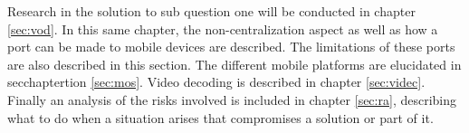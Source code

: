 Research in the solution to sub question one will be conducted in chapter \ref{sec:vod}. In this same chapter, the non-centralization aspect as well as how a port can be made to mobile devices are described. The limitations of these ports are also described in this section. The different mobile platforms are elucidated in secchaptertion \ref{sec:mos}. Video decoding is described in chapter \ref{sec:videc}. Finally an analysis of the risks involved is included in chapter \ref{sec:ra}, describing what to do when a situation arises that compromises a solution or part of it.